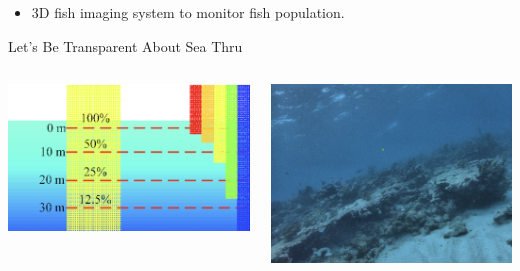\begin{frame}
    \begin{itemize}
        \item 3D fish imaging system to monitor fish population.
    \end{itemize}
    
    
\end{frame}

\begin{frame}{Let's Be Transparent About Sea Thru}
    \begin{columns}
        \begin{column}{0.5\textwidth}
            \includegraphics[height=1.0\textheight,width=1.0\textwidth,keepaspectratio]{images/light.png}
        \end{column}
        \begin{column}{0.5\textwidth}
            \includegraphics[height=1.0\textheight,width=1.0\textwidth,keepaspectratio]{images/grainy.png}
        \end{column}
    \end{columns}
\end{frame}

